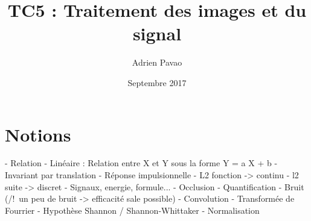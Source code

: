 \documentclass{article}
\title{TC5 : Traitement des images et du signal}
\author{Adrien Pavao}
\date{Septembre 2017}
\begin{document}
\maketitle

\tableofcontents

\section{Notions}

- Relation
- Linéaire : Relation entre X et Y sous la forme Y = a X + b
- Invariant par translation
- Réponse impulsionnelle
- L2 fonction -> continu
- l2 suite -> discret
- Signaux, energie, formule...
- Occlusion
- Quantification
- Bruit (/!\ un peu de bruit -> efficacité sale possible)
- Convolution
- Transformée de Fourrier
- Hypothèse Shannon / Shannon-Whittaker
- Normalisation
\end{document}
